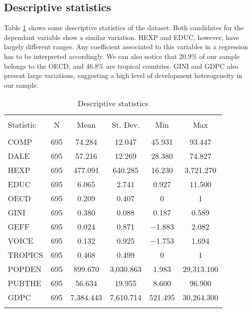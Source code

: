 \documentclass[12pt,a4paper]{article}\usepackage[]{graphicx}\usepackage[]{color}
\begin{document}
 
\subsection{Descriptive statistics}


Table \ref{tab:desc.stats} shows some descriptive statistics of the dataset. Both candidates for the dependant variable show a similar variation. HEXP and EDUC, however, have largely different ranges. Any coefficient associated to this variables in a regression has to be interpreted accordingly. We can also notice that 20.9\% of our sample belongs to the OECD, and 46.8\% are tropical countries. GINI and GDPC also present large variations, suggesting a high level of development heterogeneity in our sample.


\begin{table}[!htbp] \centering 
  \caption{Descriptive statistics} 
  \label{tab:desc.stats} 
\begin{tabular}{@{\extracolsep{5pt}}lccccc} 
\\[-1.8ex]\hline 
\hline \\[-1.8ex] 
Statistic & \multicolumn{1}{c}{N} & \multicolumn{1}{c}{Mean} & \multicolumn{1}{c}{St. Dev.} & \multicolumn{1}{c}{Min} & \multicolumn{1}{c}{Max} \\ 
\hline \\[-1.8ex] 
COMP & 695 & 74.284 & 12.047 & 45.931 & 93.447 \\ 
DALE & 695 & 57.216 & 12.269 & 28.380 & 74.827 \\ 
HEXP & 695 & 477.091 & 640.285 & 16.230 & 3,721.270 \\ 
EDUC & 695 & 6.065 & 2.741 & 0.927 & 11.500 \\ 
OECD & 695 & 0.209 & 0.407 & 0 & 1 \\ 
GINI & 695 & 0.380 & 0.088 & 0.187 & 0.589 \\ 
GEFF & 695 & 0.024 & 0.871 & $-$1.883 & 2.082 \\ 
VOICE & 695 & 0.132 & 0.925 & $-$1.753 & 1.694 \\ 
TROPICS & 695 & 0.468 & 0.499 & 0 & 1 \\ 
POPDEN & 695 & 899.670 & 3,030.863 & 1.983 & 29,313.100 \\ 
PUBTHE & 695 & 56.634 & 19.955 & 8.600 & 96.900 \\ 
GDPC & 695 & 7,384.443 & 7,610.714 & 521.495 & 30,264.300 \\ 
\hline \\[-1.8ex] 
\end{tabular} 
\end{table} 
\end{document}
